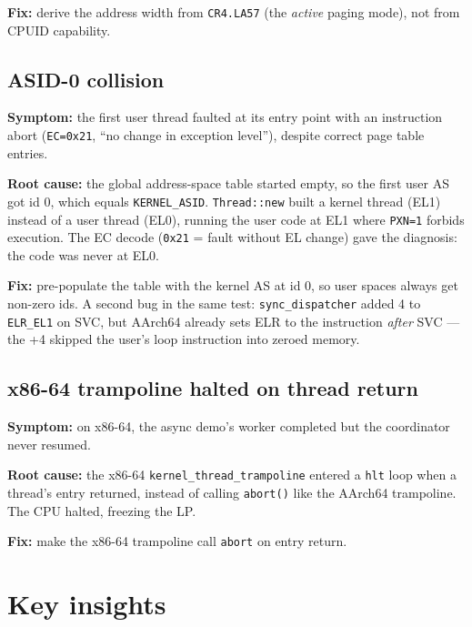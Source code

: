 \textbf{Fix:} derive the address width from \texttt{CR4.LA57} (the
\emph{active} paging mode), not from CPUID capability.

\subsection{ASID-0 collision}

\textbf{Symptom:} the first user thread faulted at its entry point with
an instruction abort (\texttt{EC=0x21}, ``no change in exception level''),
despite correct page table entries.

\textbf{Root cause:} the global address-space table started empty, so the first
user AS got id 0, which equals \texttt{KERNEL\_ASID}. \texttt{Thread::new}
built a kernel thread (EL1) instead of a user thread (EL0), running the user
code at EL1 where \texttt{PXN=1} forbids execution. The EC decode
(\texttt{0x21} = fault without EL change) gave the diagnosis: the code was
never at EL0.

\textbf{Fix:} pre-populate the table with the kernel AS at id 0, so user
spaces always get non-zero ids. A second bug in the same test:
\texttt{sync\_dispatcher} added 4 to \texttt{ELR\_EL1} on SVC, but AArch64
already sets ELR to the instruction \emph{after} SVC --- the +4 skipped the
user's loop instruction into zeroed memory.

\subsection{x86-64 trampoline halted on thread return}

\textbf{Symptom:} on x86-64, the async demo's worker completed but the
coordinator never resumed.

\textbf{Root cause:} the x86-64 \texttt{kernel\_thread\_trampoline} entered a
\texttt{hlt} loop when a thread's entry returned, instead of calling
\texttt{abort()} like the AArch64 trampoline. The CPU halted, freezing the LP.

\textbf{Fix:} make the x86-64 trampoline call \texttt{abort} on entry return.

\section{Key insights}

